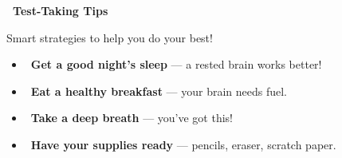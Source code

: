
\thispagestyle{empty}

{
\sffamily

\begin{center}
    \textcolor{funBlueDark}{\fontsize{24}{28}\selectfont\bfseries
    \faLightbulb~Test-Taking Tips~\faLightbulb}

    \medskip
    \textcolor{funGray}{\normalsize Smart strategies to help you do your best!}
\end{center}

\vspace{4mm}

\begin{tcolorbox}[
    enhanced,
    colback=funGreenLight,
    colframe=funGreen!50,
    arc=10pt,
    outer arc=10pt,
    boxrule=1.5pt,
    left=5mm, right=5mm, top=4mm, bottom=4mm,
    title={\textcolor{white}{\faClock~Before You Start}},
    colbacktitle=funGreen!70,
    fonttitle=\bfseries\sffamily,
]
    \small
    \begin{itemize}[leftmargin=*, itemsep=3pt]
        \item \textcolor{funGreenDark}{\faCheckCircle}~\textbf{Get a good night's sleep} ---
            a rested brain works better!
        \item \textcolor{funGreenDark}{\faCheckCircle}~\textbf{Eat a healthy breakfast} ---
            your brain needs fuel.
        \item \textcolor{funGreenDark}{\faCheckCircle}~\textbf{Take a deep breath} ---
            you've got this!
        \item \textcolor{funGreenDark}{\faCheckCircle}~\textbf{Have your supplies ready} ---
            pencils, eraser, scratch paper.
    \end{itemize}
\end{tcolorbox}

\vspace{2mm}

}
